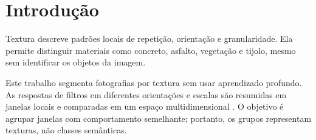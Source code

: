 \section{Introdução}

Textura descreve padrões locais de repetição, orientação e granularidade. Ela permite distinguir materiais como concreto, asfalto, vegetação e tijolo, mesmo sem identificar os objetos da imagem.

Este trabalho segmenta fotografias por textura sem usar aprendizado profundo. As respostas de filtros em diferentes orientações e escalas são resumidas em janelas locais e comparadas em um espaço multidimensional \cite{todt}. O objetivo é agrupar janelas com comportamento semelhante; portanto, os grupos representam texturas, não classes semânticas.
